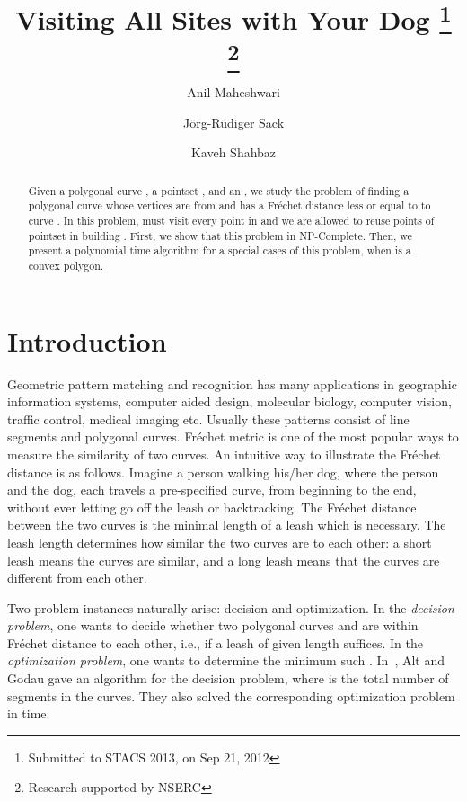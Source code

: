 \documentclass[a4paper,UKenglish]{lipics}
\title{Visiting All Sites with Your Dog 
\footnote{Submitted to STACS 2013, on Sep 21, 2012}
\footnote{Research supported by NSERC}}
\author[1]{Anil Maheshwari}
\author[2]{J\"{o}rg-R\"{u}diger Sack }
\author[3]{Kaveh Shahbaz}
\affil[1,2,3]{~School of Computer Scince \\ Carleton University 
\\ Ottawa, Ontario, Canada \\
Email: {\tt \{anil,sack,kshahbaz\}@scs.carleton.ca}}
\newcommand{\Frechet}{Fr\'echet }
\begin{document}
\maketitle

\begin{abstract}
Given a polygonal curve , a pointset ,
and an ,
we study the problem of finding a polygonal curve 
whose vertices are from  and 
has a \Frechet distance less or equal to  to curve .
In this problem,  must visit every point in 
and we are allowed to reuse points of pointset in building .
First, we show that this problem in NP-Complete. 
Then, we present a polynomial time algorithm for 
a special cases of this problem, when 
 is a convex polygon.
\end{abstract}











\section {Introduction}

Geometric pattern matching and recognition has many applications in 
geographic information systems, computer aided design,
molecular biology, computer vision, traffic control, medical imaging etc.
Usually these patterns consist of line segments and polygonal curves. 
\Frechet metric is one of the most popular ways to measure the similarity of two curves. 
An intuitive way to illustrate the \Frechet distance is as follows.
Imagine a person walking his/her dog, where the person and the dog, 
each travels a pre-specified curve, from beginning to the end, 
without ever letting go off the leash or backtracking.
The \Frechet distance between the two curves is the minimal length of a leash which is necessary.
The leash length determines how similar the two curves are to each other:
a short leash means the curves are similar,
and a long leash means that the curves are different from each other.

Two problem instances naturally arise:  decision and optimization.
In the {\em decision problem}, one wants to decide whether two polygonal curves   and 
are within  \Frechet distance to each other, i.e., if a leash of given length  suffices.
In the {\em optimization problem}, one wants to determine the minimum such .
In~\cite{AltG95}, Alt and Godau gave an  algorithm for the decision problem,
where  is the total number of segments in the curves.
They also solved the corresponding optimization problem in  time.
\end{document}
